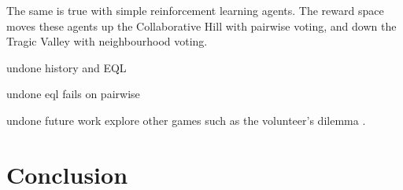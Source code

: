 \documentclass[]{llncs} %
\begin{document}
The same is true with simple reinforcement learning agents.  The reward space
moves these agents up the Collaborative Hill with pairwise voting, and
down the Tragic Valley with neighbourhood voting.

undone history and EQL

undone eql fails on pairwise

undone future work explore other games such as the volunteer's dilemma \cite {Archetti}.

\section{Conclusion}
\label{sec:conclusion}




\begin{subappendices} %
\label{app:original_results}


\end{subappendices}
\end{document}
